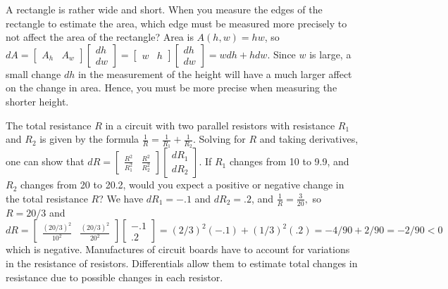 \begin{example}
A rectangle is rather wide and short.  When you measure the edges of
the rectangle to estimate the area, which edge must be measured more
precisely to not affect the area of the rectangle?  Area is
$A(h,w)=hw$, so $dA =
\begin{bmatrix}A_h&A_w\end{bmatrix}\begin{bmatrix}dh\\dw\end{bmatrix}
= \begin{bmatrix}w&h\end{bmatrix}\begin{bmatrix}dh\\dw\end{bmatrix} =
wdh+hdw$. Since $w$ is large, a small change $dh$ in the measurement
of the height will have a much larger affect on the change in area. 
Hence, you must be more precise when measuring the shorter height.
\end{example}

\begin{example}
The total resistance {$R$} in a circuit with two parallel resistors
with resistance {$R_1$} and {$R_2$} is given by the formula {$
\frac{1}{R} = \frac{1}{R_1}+\frac{1}{R_2} $}.  Solving for $R$ and
taking derivatives, one can show that {$ dR =
\begin{bmatrix}\frac{R^2}{R_1^2} & \frac{R^2}{R_2^2} \end{bmatrix}
\begin{bmatrix}dR_1\\dR_2\end{bmatrix}$}. If {$ R_1 $} changes from 10
to 9.9, and {$ R_2 $} changes from 20 to 20.2, would you expect a
positive or negative change in the total resistance {$R$}? We have
$dR_1 = -.1$ and $dR_2=.2$, and $\frac{1}{R} = \frac{3}{20},$ so
$R=20/3$ and $dR = \begin{bmatrix}\frac{(20/3)^2}{10^2} &
\frac{(20/3)^2}{20^2} \end{bmatrix}
\begin{bmatrix}-.1\\.2\end{bmatrix} = 
(2/3)^2(-.1) + (1/3)^2(.2) = -4/90+2/90=-2/90<0$ which is negative.
Manufactures of circuit boards have to account for variations in the
resistance of resistors.  Differentials allow them to estimate total
changes in resistance due to possible changes in each resistor. 
\end{example}

